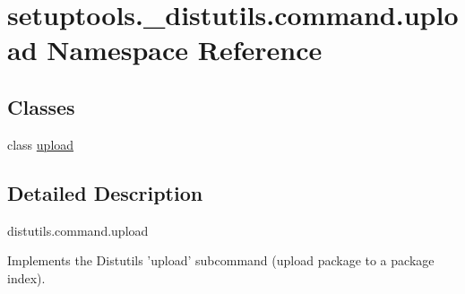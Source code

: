 \hypertarget{namespacesetuptools_1_1__distutils_1_1command_1_1upload}{}\section{setuptools.\+\_\+distutils.\+command.\+upload Namespace Reference}
\label{namespacesetuptools_1_1__distutils_1_1command_1_1upload}
\subsection*{Classes}
\begin{DoxyCompactItemize}
\item 
class \hyperlink{classsetuptools_1_1__distutils_1_1command_1_1upload_1_1upload}{upload}
\end{DoxyCompactItemize}


\subsection{Detailed Description}
\begin{DoxyVerb}distutils.command.upload

Implements the Distutils 'upload' subcommand (upload package to a package
index).
\end{DoxyVerb}
 